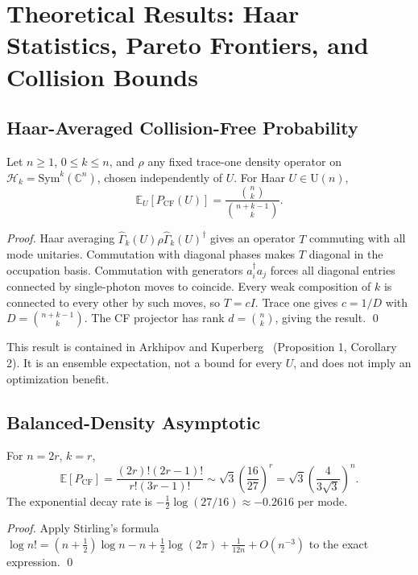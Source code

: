 \section{Theoretical Results: Haar Statistics, Pareto Frontiers, and Collision Bounds}
\label{sec:theory}

\subsection{Haar-Averaged Collision-Free Probability}

\begin{theorem}
\label{thm:haar_cf}
Let $n \ge 1$, $0 \le k \le n$, and $\rho$ any fixed trace-one density operator on $\mathcal{H}_k = \mathrm{Sym}^k(\mathbb{C}^n)$, chosen independently of $U$. For Haar $U \in \mathrm{U}(n)$,
\begin{equation}
\mathbb{E}_U[P_{\mathrm{CF}}(U)] = \frac{\binom{n}{k}}{\binom{n+k-1}{k}}.
\end{equation}
\end{theorem}
\begin{proof}
Haar averaging $\hat{\Gamma}_k(U) \rho \hat{\Gamma}_k(U)^\dagger$ gives an operator $T$ commuting with all mode unitaries. Commutation with diagonal phases makes $T$ diagonal in the occupation basis. Commutation with generators $a_i^\dagger a_j$ forces all diagonal entries connected by single-photon moves to coincide. Every weak composition of $k$ is connected to every other by such moves, so $T = c I$. Trace one gives $c = 1/D$ with $D = \binom{n+k-1}{k}$. The CF projector has rank $d = \binom{n}{k}$, giving the result. \qed
\end{proof}

This result is contained in Arkhipov and Kuperberg~\cite{arkhipov2012bosonic} (Proposition 1, Corollary 2). It is an ensemble expectation, not a bound for every $U$, and does not imply an optimization benefit.

\subsection{Balanced-Density Asymptotic}

\begin{corollary}
\label{cor:balanced_asymptotic}
For $n=2r$, $k=r$,
\begin{equation}
\mathbb{E}[P_{\mathrm{CF}}] = \frac{(2r)!(2r-1)!}{r!(3r-1)!} \sim \sqrt{3} \left(\frac{16}{27}\right)^r = \sqrt{3} \left(\frac{4}{3\sqrt{3}}\right)^n.
\end{equation}
The exponential decay rate is $-\frac{1}{2}\log(27/16) \approx -0.2616$ per mode.
\end{corollary}
\begin{proof}
Apply Stirling's formula $\log n! = (n+\frac{1}{2})\log n - n + \frac{1}{2}\log(2\pi) + \frac{1}{12n} + O(n^{-3})$ to the exact expression. \qed
\end{proof}

